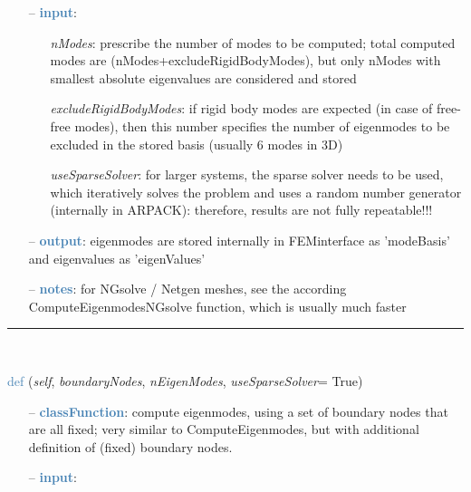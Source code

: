 \begin{itemize}[leftmargin=1.4cm]
\begin{itemize}[leftmargin=1.4cm]
\begin{itemize}[leftmargin=0.5cm]
\begin{itemize}[leftmargin=1.4cm]
\begin{itemize}[leftmargin=1.4cm]
\begin{itemize}[leftmargin=0.5cm]
\begin{itemize}[leftmargin=0.7cm]
\item[--]\textcolor{steelblue}{\bf input}: \vspace{-6pt}
\begin{itemize}[leftmargin=1.2cm]
\setlength{\itemindent}{-0.7cm}
\item[]{\it nModes}: prescribe the number of modes to be computed; total computed modes are  (nModes+excludeRigidBodyModes), but only nModes with smallest absolute eigenvalues are considered and stored
\item[]{\it excludeRigidBodyModes}: if rigid body modes are expected (in case of free-free modes), then this number specifies the number of eigenmodes to be excluded in the stored basis (usually 6 modes in 3D)
\item[]{\it useSparseSolver}: for larger systems, the sparse solver needs to be used, which iteratively solves the problem and uses a random number generator (internally in ARPACK): therefore, results are not fully repeatable!!!
\end{itemize}
\item[--]\textcolor{steelblue}{\bf output}: eigenmodes are stored internally in FEMinterface as 'modeBasis' and eigenvalues as 'eigenValues'
\item[--]\textcolor{steelblue}{\bf notes}: for NGsolve / Netgen meshes, see the according ComputeEigenmodesNGsolve function, which is usually much faster
\vspace{12pt}\end{itemize}
%
\noindent\rule{8cm}{0.75pt}\vspace{1pt} \\ 
\begin{flushleft}
\noindent \textcolor{steelblue}{def {\bf {}}}\label{sec:FEM:FEMinterface:ComputeEigenModesWithBoundaryNodes}
({\it self}, {\it boundaryNodes}, {\it nEigenModes}, {\it useSparseSolver}= True)
\end{flushleft}
\setlength{\itemindent}{0.7cm}
\begin{itemize}[leftmargin=0.7cm]
\item[--]\textcolor{steelblue}{\bf classFunction}: compute eigenmodes, using a set of boundary nodes that are all fixed; very similar to ComputeEigenmodes, but with additional definition of (fixed) boundary nodes.
\item[--]\textcolor{steelblue}{\bf input}: \vspace{-6pt}
\begin{itemize}[leftmargin=1.2cm]

\end{itemize}
\end{itemize}
\end{itemize}
\end{itemize}
\end{itemize}
\end{itemize}
\end{itemize}
\end{itemize}

